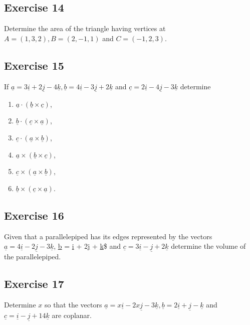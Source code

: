 \documentclass[
  11pt,
  oneside]{book}
\providecommand{\tightlist}{%
  \setlength{\itemsep}{0pt}\setlength{\parskip}{0pt}}
\newcommand{\slide}{}
\theoremstyle{definition}
\theoremstyle{definition}
\theoremstyle{definition}
\theoremstyle{definition}
\theoremstyle{remark}
\begin{document}
\slide

\subsection*{Exercise 14}\label{exercise-14}

Determine the area of the triangle having vertices at \(A=(1,3,2), B=(2, -1,1)\) and \(C=(-1,2,3)\).

\slide

\subsection*{Exercise 15}\label{exercise-15}

If \(\underline{a} = 3\underline{i} + 2\underline{j} - 4\underline{k}, \underline{b} = 4\underline{i} - 3\underline{j} + 2\underline{k}\) and \(\underline{c} = 2\underline{i} - 4\underline{j} - 3\underline{k}\) determine

\begin{enumerate}
\def\labelenumi{\arabic{enumi}.}
\tightlist
\item
  \(\underline{a} \cdot (\underline{b} \times \underline{c})\),
\item
  \(\underline{b} \cdot (\underline{c} \times \underline{a})\),
\item
  \(\underline{c} \cdot (\underline{a} \times \underline{b})\),
\item
  \(\underline{a} \times (\underline{b} \times \underline{c})\),
\item
  \(\underline{c} \times (\underline{a} \times \underline{b})\),
\item
  \(\underline{b} \times (\underline{c} \times \underline{a})\).
\end{enumerate}

\slide

\subsection*{Exercise 16}\label{exercise-16}

Given that a parallelepiped has its edges represented by the vectors \(\underline{a} = 4\underline{i} - 2\underline{j} - 3\underline{k}\), \underline{b} = \underline{i} + 2\underline{j} + \underline{k}\$ and \(\underline{c} = 3\underline{i} - \underline{j} + 2\underline{k}\) determine the volume of the parallelepiped.

\slide

\subsection*{Exercise 17}\label{exercise-17}

Determine \(x\) so that the vectors \(\underline{a} = x\underline{i} - 2x\underline{j} - 3\underline{k}, \underline{b} =2 \underline{i} + \underline{j} - \underline{k}\) and \(\underline{c} = \underline{i} - \underline{j} + 14\underline{k}\) are coplanar.

\cleardoublepage
{}
\printindex
\end{document}
